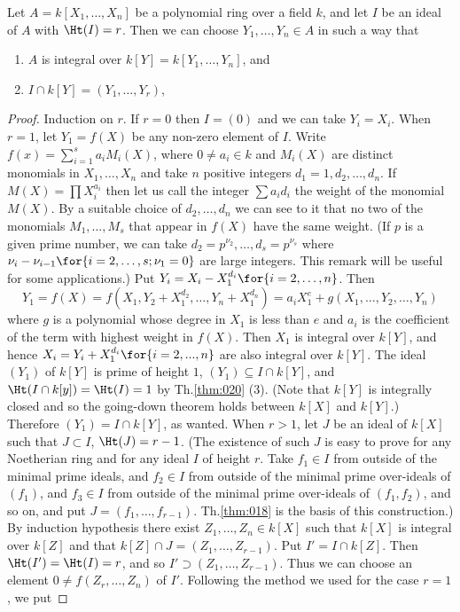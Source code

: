 \documentclass[../main]{subfiles}
\begin{document}
\begin{partheorem}\label{thm:024}
Let $A = k[X_1,\ldots,X_n]$ be a polynomial ring over a field $k$, and let $I$ be an ideal of $A$ with $\Ht(I)=r$. Then we can choose $Y_1,\ldots,Y_n\in A$ in such a way that
\begin{enumerate}[label=\arabic*)]
    \item $A$ is integral over $k[Y] = k[Y_1,\ldots,Y_n]$, and
    \item $I\cap k[Y] = (Y_1,\ldots,Y_r)$,
\end{enumerate}
\end{partheorem}
\begin{proof}
Induction on $r$. If $r= 0$ then $I = (0)$ and we can take $Y_i=X_i$. When $r = 1$, let $Y_1=f(X)$ be any non-zero element of $I$. Write $f(x) = \sum_{i=1}^sa_iM_i(X)$, where $0 \neq a_i\in k$ and $M_i(X)$ are distinct monomials in $X_1,\ldots,X_n$ and take $n$ positive integers $d_1=1,d_2,\ldots,d_n$. If $M(X) = \prod X_i^{a_i}$ then let us call the integer $\sum a_id_i$ the weight of the monomial $M(X)$. By a suitable choice of $d_2,\ldots,d_n$ we can see to it that no two of the monomials $M_1,\ldots,M_s$ that appear in $f(X)$ have the same weight. (If $p$ is a given prime number, we can take $d_2=p^{\nu_2},\ldots,d_s = p^{\nu_s}$ where $\nu_i-\nu_{i-1}\for{i = 2,\ldots,s;\nu_1 = 0}$ are large integers. This remark will be useful for some applications.) Put $Y_i =X_i-X_1^{d_i}\for{i=2,\ldots,n}$. Then \[Y_1 = f(X) = f(X_1,Y_2+X_1^{d_2},\ldots,Y_n+X_1^{d_n})=a_iX_1^e+g(X_1,\ldots,Y_2,\ldots,Y_n)\] where $g$ is a polynomial whose degree in $X_1$ is less than $e$ and $a_i$ is the coefficient of the term with highest weight in $f(X)$. Then $X_1$ is integral over $k[Y]$, and hence $X_i=Y_i+X_1^{d_i}\for{i = 2,...,n}$ are also integral over $k[Y]$. The ideal $(Y_1)$ of $k[Y]$ is prime of height $1$, $(Y_1)\subseteq I\cap k[Y]$, and $\Ht(I\cap k[y]) = \Ht(I) = 1$ by Th.\ref{thm:020} (3). (Note that $k[Y]$ is integrally closed and so the going-down theorem holds between $k[X]$ and $k[Y]$.) Therefore $(Y_1) = I\cap k[Y]$, as wanted. When $r > 1$, let $J$ be an ideal of $k[X]$ such that $J\subset I$, $\Ht(J) =r-1$. (The existence of such $J$ is easy to prove for any Noetherian ring and for any ideal $I$ of height $r$. Take $f_1 \in I$ from outside of the minimal prime ideals, and $f_2\in I$ from outside of the minimal prime over-ideals of $(f_1)$, and $f_3\in I$ from outside of the minimal prime over-ideals of $(f_1,f_2)$, and so on, and put $J = (f_1,\ldots,f_{r-1})$. Th.\ref{thm:018} is the basis of this construction.) By induction hypothesis there exist $Z_1,\ldots,Z_n\in k[X]$ such that $k[X]$ is integral over $k[Z]$ and that $k[Z]\cap J=(Z_1,\ldots,Z_{r-1})$. Put $I' = I\cap k[Z]$. Then $\Ht(I') = \Ht(I) = r$, and so $I'\supset(Z_1,\ldots, Z_{r-1})$. Thus we can choose an element $0\neq f(Z_r,\ldots,Z_n)$ of $I'$. Following the method we used for the case $r = 1$, we put

\end{proof}
\end{document}
